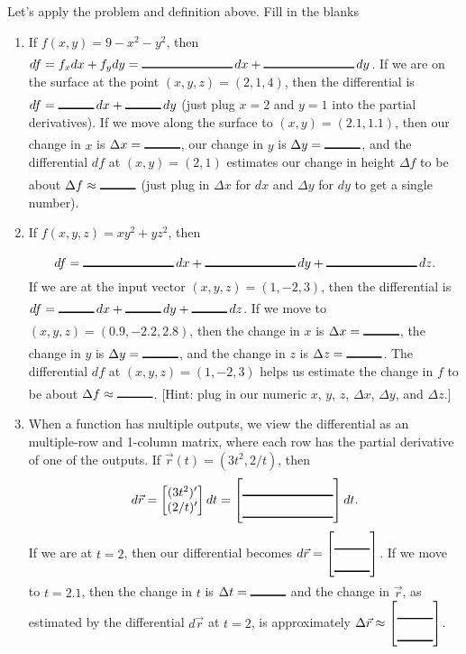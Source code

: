\begin{problem} Let's apply the problem and definition above.  Fill in the blanks
  \begin{enumerate}
  \item If $f(x,y)=9-x^2-y^2$, then $df = f_xdx+f_ydy=\blank{1in}\,dx+\blank{1in}\,dy$.  If we are on the surface at the point $(x,y,z)=(2,1,4)$, then the differential is $df=\blank{1cm}\,dx+\blank{1cm}\,dy$ (just plug $x=2$ and $y=1$ into the partial derivatives).  If we move along the surface to $(x,y)=(2.1,1.1)$, then our change in $x$ is $\Delta x=\blank{1cm}$, our change in $y$ is $\Delta y=\blank{1cm}$, and the differential $df$ at $(x,y)=(2,1)$ estimates our change in height $\Delta f$ to be about $\Delta f\approx \blank{1cm}$ (just plug in $\Delta x$ for $dx$ and $\Delta y$ for $dy$ to get a single number).
  \item   If $f(x,y,z)=xy^2+yz^2$, then $$df = \blank{1in}\,dx+\blank{1in}\,dy+\blank{1in}\,dz.$$  If we are at the input vector $(x,y,z)=(1,-2,3)$, then the differential is $df = \blank{1cm}\,dx+\blank{1cm}\,dy+\blank{1cm}\,dz$.  If we move to $(x,y,z)=(0.9, -2.2, 2.8)$, then the change in $x$ is $\Delta x=\blank{1cm}$, the change in $y$ is $\Delta y=\blank{1cm}$, and the change in $z$ is $\Delta z=\blank{1cm}$.  The differential $df$ at $(x,y,z)=(1,-2,3)$ helps us estimate the change in $f$ to be about $\Delta f\approx \blank{1cm}$. [Hint: plug in our numeric $x$, $y$, $z$, $\Delta x$, $\Delta y$, and $\Delta z$.]
  \item When a function has multiple outputs, we view the differential as an multiple-row and 1-column matrix, where each row has the partial derivative of one of the outputs.  If $\vec r(t)=(3t^2, 2/t)$, then $$d\vec r = \begin{bmatrix}(3t^2)' \\ (2/t)'\end{bmatrix} dt=\begin{bmatrix}\blank{1in}\\\blank{1in}\end{bmatrix}dt.$$
If we are at $t=2$, then our differential becomes $d\vec r = \begin{bmatrix}\blank{1cm}\\\blank{1cm}\end{bmatrix}$.  If we move to $t=2.1$, then the change in $t$ is $\Delta t=\blank{1cm}$ and the change in $\vec r$, as estimated by the differential $d\vec r$ at $t=2$, is approximately $\Delta \vec r\approx \begin{bmatrix}\blank{1cm}\\\blank{1cm}\end{bmatrix}$.

\end{enumerate}
\end{problem}
